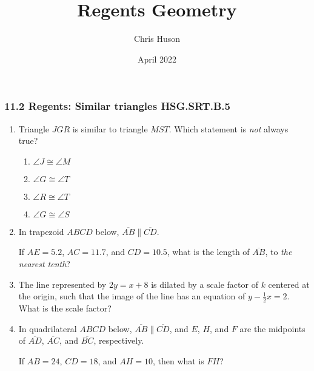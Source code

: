 \documentclass[12pt, oneside]{article}
\title{Regents Geometry}
\author{Chris Huson}
\date{April 2022}
\begin{document}
\subsubsection*{11.2 Regents: Similar triangles \hfill HSG.SRT.B.5}
\begin{enumerate}[itemsep=1.7cm]
\item Triangle $JGR$ is similar to triangle $MST$. Which statement is \emph{not}
always true?
\begin{multicols}{2}
  \begin{enumerate}
    \item $\angle J \cong \angle M$
    \item $\angle G \cong \angle T$ 
    \item $\angle R \cong \angle T$
    \item $\angle G \cong \angle S$
  \end{enumerate}
\end{multicols}

\item In trapezoid $ABCD$ below, $\overline{AB} \parallel \overline{CD}$.
\begin{center}
  \end{center}
If $AE=5.2$, $AC=11.7$, and $CD=10.5$, what is the length of $\overline{AB}$, to \emph{the nearest tenth}?

\item The line represented by $2y=x+8$ is dilated by a scale factor
of $k$ centered at the origin, such that the image of the line has an
equation of $y - \frac{1}{2} x=2$. What is the scale factor?

\item In quadrilateral $ABCD$ below, $\overline{AB} \parallel \overline{CD}$, and $E$, $H$, and $F$ are the midpoints of $\overline{AD}$, $\overline{AC}$,  and $\overline{BC}$, respectively.
\begin{center}
  \end{center}
If $AB=24$, $CD=18$, and $AH=10$, then what is $FH$?


\end{enumerate}
\end{document}
